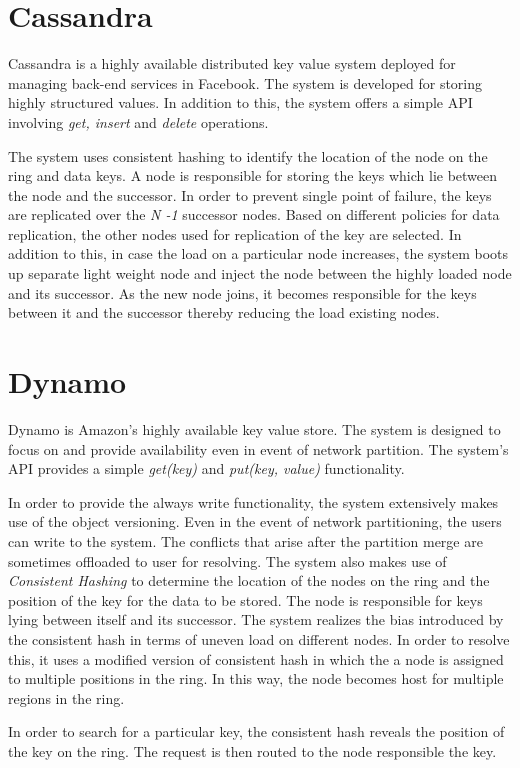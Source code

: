\documentclass[a4paper,11pt]{kth-mag}
\begin{document}
\section{Cassandra}
Cassandra \cite{cassandra} is a highly available distributed key value system deployed for managing back-end services in Facebook. The system is developed for storing highly structured values. In addition to this, the system offers a simple API involving \textit{get, insert} and \textit{delete} operations.
\par The system uses consistent hashing to identify the location of the node on the ring and data keys. A node is responsible for storing the keys which lie between the node and the successor. In order to prevent single point of failure, the keys are replicated over the \textit{N -1} successor nodes. Based on different policies for data replication, the other nodes used for replication of the key are selected. In addition to this, in case the load on a particular node increases, the system boots up separate light weight node and inject the node between the highly loaded node and its successor. As the new node joins, it becomes responsible for the keys between it and the successor thereby reducing the load existing nodes.

\section{Dynamo}
Dynamo \cite{dynamo} is Amazon's highly available key value store. The system is designed to focus on and provide availability even in event of network partition. The system's API provides a simple \textit{get(key)} and \textit{put(key, value)} functionality.

\par In order to provide the always write functionality, the system extensively makes use of the object versioning. Even in the event of network partitioning, the users can write to the system. The conflicts that arise after the partition merge are sometimes offloaded to user for resolving. The system also makes use of \textit{Consistent Hashing} to determine the location of the nodes on the ring and the position of the key for the data to be stored. The node is responsible for keys lying between itself and its successor. The system realizes the bias introduced by the consistent hash in terms of uneven load on different nodes. In order to resolve this, it uses a modified version of consistent hash in which the a node is assigned to multiple positions in the ring. In this way, the node becomes host for multiple regions in the ring.
\par In order to search for a particular key, the consistent hash reveals the position of the key on the ring. The request is then routed to the node responsible the key.
\end{document}
